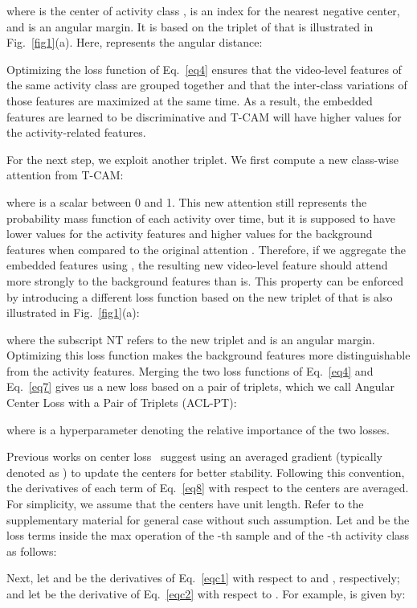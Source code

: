 \documentclass[runningheads]{llncs}
\newcommand{\tcam}{\mbox{T-CAM}}
\newcommand{\intlossnamelong}{Angular Center Loss with a Pair of Triplets}
\newcommand{\intlossname}{\mbox{ACL-PT}}
\begin{document}
where  is the center of activity class ,  is an index for the nearest negative center, and  is an angular margin. It is based on the triplet of  that is illustrated in Fig.~\ref{fig1}(a). Here,  represents the angular distance:

Optimizing the loss function of Eq.~\ref{eq4} ensures that the video-level features of the same activity class are grouped together and that the inter-class variations of those features are maximized at the same time. As a result, the embedded features are learned to be discriminative and \tcam{} will have higher values for the activity-related features.

For the next step, we exploit another triplet. We first compute a new class-wise attention  from \tcam{}:

where  is a scalar between 0 and 1. This new attention still represents the probability mass function of each activity over time, but it is supposed to have lower values for the activity features and higher values for the background features when compared to the original attention . Therefore, if we aggregate the embedded features  using , the resulting new video-level feature  should attend more strongly to the background features than  is. This property can be enforced by introducing a different loss function based on the new triplet of  that is also illustrated in Fig.~\ref{fig1}(a):

where the subscript NT refers to the new triplet and  is an angular margin. Optimizing this loss function makes the background features more distinguishable from the activity features. Merging the two loss functions of Eq.~\ref{eq4} and Eq.~\ref{eq7} gives us a new loss based on a pair of triplets, which we call \intlossnamelong{} (\intlossname{}):

where  is a hyperparameter denoting the relative importance of the two losses.

Previous works on center loss~\cite{wen2016discriminative,he2018triplet,li2019angular} suggest using an averaged gradient (typically denoted as ) to update the centers for better stability. Following this convention, the derivatives of each term of Eq.~\ref{eq8} with respect to the centers are averaged. For simplicity, we assume that the centers have unit length. Refer to the supplementary material for general case without such assumption. Let  and  be the loss terms inside the max operation of the -th sample and of the -th activity class as follows:


Next, let  and  be the derivatives of Eq.~\ref{eqc1} with respect to  and , respectively; and let  be the derivative of Eq.~\ref{eqc2} with respect to . For example,  is given by:
\end{document}
